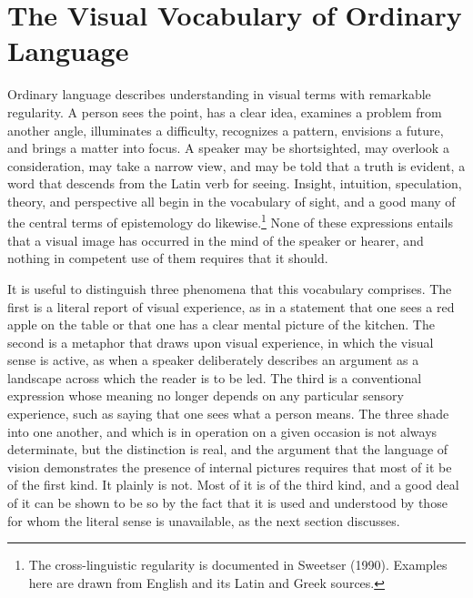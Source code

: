 \documentclass[11pt]{article}
\theoremstyle{remark}
\begin{document}
\section{The Visual Vocabulary of Ordinary Language}

Ordinary language describes understanding in visual terms with remarkable regularity. A person sees the point, has a clear idea, examines a problem from another angle, illuminates a difficulty, recognizes a pattern, envisions a future, and brings a matter into focus. A speaker may be shortsighted, may overlook a consideration, may take a narrow view, and may be told that a truth is evident, a word that descends from the Latin verb for seeing. Insight, intuition, speculation, theory, and perspective all begin in the vocabulary of sight, and a good many of the central terms of epistemology do likewise.\footnote{The cross-linguistic regularity is documented in Sweetser (1990). Examples here are drawn from English and its Latin and Greek sources.} None of these expressions entails that a visual image has occurred in the mind of the speaker or hearer, and nothing in competent use of them requires that it should.

It is useful to distinguish three phenomena that this vocabulary comprises. The first is a literal report of visual experience, as in a statement that one sees a red apple on the table or that one has a clear mental picture of the kitchen. The second is a metaphor that draws upon visual experience, in which the visual sense is active, as when a speaker deliberately describes an argument as a landscape across which the reader is to be led. The third is a conventional expression whose meaning no longer depends on any particular sensory experience, such as saying that one sees what a person means. The three shade into one another, and which is in operation on a given occasion is not always determinate, but the distinction is real, and the argument that the language of vision demonstrates the presence of internal pictures requires that most of it be of the first kind. It plainly is not. Most of it is of the third kind, and a good deal of it can be shown to be so by the fact that it is used and understood by those for whom the literal sense is unavailable, as the next section discusses.
\end{document}
